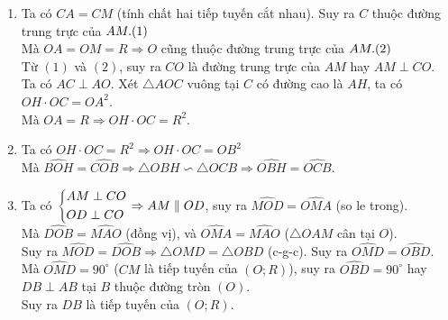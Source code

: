 \begin{bt}
{\begin{center}
\end{center}
\begin{enumerate}
	\item Ta có $CA=CM$ (tính chất hai tiếp tuyến cắt nhau). Suy ra $C$ thuộc đường trung trực của $AM. \hfill(1)$\\
	Mà $OA=OM=R\Rightarrow O$ cũng thuộc đường trung trực của $AM. \hfill (2)$\\
	Từ $(1)$ và $(2)$, suy ra $CO$ là đường trung trực của $AM$ hay $AM\perp CO$.\\
	Ta có $AC\perp AO$. Xét $\triangle AOC$ vuông tại $C$ có đường cao là $AH$, ta có $OH\cdot OC=OA^2$.\\
	Mà $OA=R\Rightarrow OH\cdot OC= R^2$.
	\item Ta có $OH\cdot OC=R^2\Rightarrow OH\cdot OC= OB^2$\\
	Mà $\widehat{BOH}=\widehat{ COB}\Rightarrow \triangle OBH \backsim \triangle OCB\Rightarrow \widehat{OBH}=\widehat{OCB}$.
	\item Ta có $\left\{\begin{aligned}&AM \perp CO\\&OD \perp CO\end{aligned}\right.\Rightarrow AM \parallel OD$, suy ra $\widehat{MOD}=\widehat{OMA}$ (so le trong).\\
	Mà $\widehat{DOB}=\widehat{MAO}$ (đồng vị), và $\widehat{OMA}=\widehat{MAO}$ ($\triangle OAM$ cân tại $O$).\\
	Suy ra $\widehat{MOD}=\widehat{DOB}\Rightarrow \triangle OMD =\triangle OBD$ (c-g-c). Suy ra $\widehat{OMD}=\widehat{OBD}$.\\
	Mà $\widehat{OMD}=90^\circ$ ($CM$ là tiếp tuyến của $(O;R)$), suy ra $\widehat{OBD}=90^\circ$ hay $DB\perp AB$ tại $B$ thuộc đường tròn $(O)$.\\
	Suy ra $DB$ là tiếp tuyến của $(O;R)$.
\end{enumerate}
}
\end{bt}

